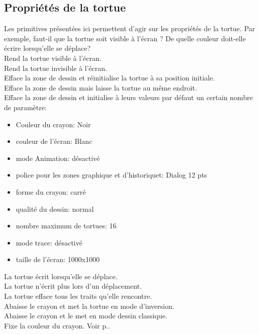 \subsection{Propriétés de la tortue}
Les primitives présentées ici permettent d'agir sur les
propriétés de la tortue. Par exemple, faut-il que la tortue soit
visible à l'écran ? De quelle couleur doit-elle écrire lorsqu'elle
se déplace?\\
 Rend la tortue visible à l'écran.\\
Rend la tortue invisible à l'écran.\\
 Efface la zone de dessin et réinitialise la tortue à sa position initiale.\\
 Efface la zone de dessin mais laisse la tortue au même endroit.\\
 Efface la zone de dessin et initialise à leurs valeurs par défaut un certain nombre de paramètre: 
\begin{itemize}
 \item Couleur du crayon: Noir
 \item couleur de l'écran: Blanc
 \item mode Animation: désactivé
 \item police pour les zones graphique et d'historiquet: Dialog 12 pts
 \item forme du crayon: carré
 \item qualité du dessin: normal
 \item nombre maximum de tortues: 16
 \item mode trace: désactivé
 \item taille de l'écran: 1000x1000
\end{itemize}
\noindent
{}
 La tortue écrit lorsqu'elle se déplace.\\
 La tortue n'écrit plus lors d'un déplacement.\\
 La tortue efface tous les traits qu'elle rencontre.\\
 Abaisse le crayon et met la tortue en mode d'inversion.\\
 Abaisse le crayon et le met en mode dessin classique.\\
\label{fcc} Fixe la couleur du crayon. Voir p.\pageref{couleurs}.\\
